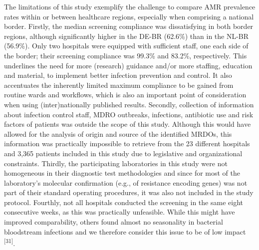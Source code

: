 \documentclass[
]{book}
\begin{document}
The limitations of this study exemplify the challenge to compare AMR prevalence rates within or between healthcare regions, especially when comprising a national border. Firstly, the median screening compliance was dissatisfying in both border regions, although significantly higher in the DE-BR (62.6\%) than in the NL-BR (56.9\%). Only two hospitals were equipped with sufficient staff, one each side of the border; their screening compliance was 99.3\% and 83.2\%, respectively. This underlines the need for more (research) guidance and/or more staffing, education and material, to implement better infection prevention and control. It also accentuates the inherently limited maximum compliance to be gained from routine wards and workflows, which is also an important point of consideration when using (inter)nationally published results. Secondly, collection of information about infection control staff, MDRO outbreaks, infections, antibiotic use and risk factors of patients was outside the scope of this study. Although this would have allowed for the analysis of origin and source of the identified MRDOs, this information was practically impossible to retrieve from the 23 different hospitals and 3,365 patients included in this study due to legislative and organizational constraints. Thirdly, the participating laboratories in this study were not homogeneous in their diagnostic test methodologies and since for most of the laboratory's molecular confirmation (e.g., of resistance encoding genes) was not part of their standard operating procedures, it was also not included in the study protocol. Fourthly, not all hospitals conducted the screening in the same eight consecutive weeks, as this was practically unfeasible. While this might have improved comparability, others found almost no seasonality in bacterial bloodstream infections and we therefore consider this issue to be of low impact \textsuperscript{{[}31{]}}.
\end{document}
